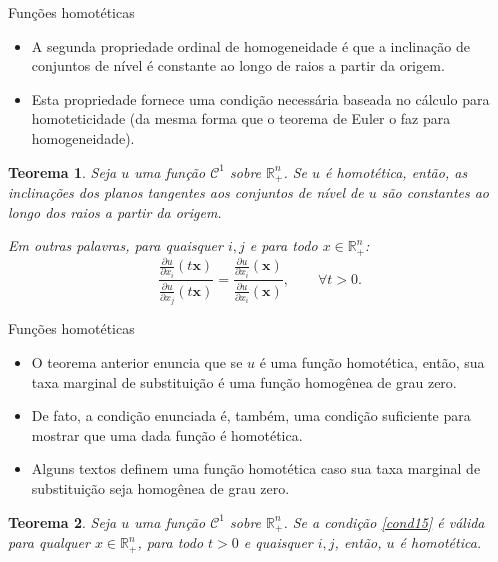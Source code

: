 \documentclass[10pt]{beamer}
\newtheorem{teo}{Teorema}
\begin{document}
\begin{frame}{Funções homotéticas}
    \begin{itemize}
        \item A segunda propriedade ordinal de homogeneidade é que a inclinação de conjuntos de nível é constante ao longo de raios a partir da origem.
        \bigskip         
        \item Esta propriedade fornece uma condição necessária baseada no cálculo para homoteticidade (da mesma forma que o teorema de Euler o faz para homogeneidade).
    \end{itemize}
    \begin{teo}
        Seja $u$ uma função $\mathcal{C}^1$ sobre $\mathbb{R}_+^n$. Se $u$ é homotética, então, as inclinações dos planos tangentes aos conjuntos de nível de $u$ são constantes ao longo dos raios a partir da origem.

        Em outras palavras, para quaisquer $i,j$ e para todo $x \in \mathbb{R}_+^n$:
        \begin{equation}
            \frac{\frac{\partial u}{\partial x_i}(t\mathbf{x})}{\frac{\partial u}{\partial x_j}(t\mathbf{x})} = \frac{\frac{\partial u}{\partial x_i}(\mathbf{x})}{\frac{\partial u}{\partial x_i}(\mathbf{x})}, \qquad \forall t>0.
            \label{cond15}
        \end{equation}
    \end{teo}            
\end{frame}

\begin{frame}{Funções homotéticas}
    \begin{itemize}
        \item O teorema anterior enuncia que se $u$ é uma função homotética, então, sua taxa marginal de substituição é uma função homogênea de grau zero.
        \bigskip
        \item De fato, a condição enunciada é, também, uma condição suficiente para mostrar que uma dada função é homotética.
        \bigskip
        \item Alguns textos definem uma função homotética caso sua taxa marginal de substituição seja homogênea de grau zero.        
    \end{itemize}    
    \begin{teo}
        Seja $u$ uma função $\mathcal{C}^1$ sobre $\mathbb{R}_+^n$. Se a condição \ref{cond15} é válida para qualquer $x \in \mathbb{R}_+^n$, para todo $t > 0$ e quaisquer $i,j$, então, $u$ é homotética.
    \end{teo}
\end{frame}
\end{document}
